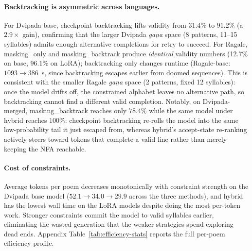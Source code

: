 \documentclass[11pt]{article}
\begin{document}
\paragraph{Backtracking is asymmetric across languages.}
For Dvipada-base, checkpoint backtracking lifts validity from $31.4\%$ to
$91.2\%$ (a $2.9\times$ gain), confirming that the larger Dvipada
\textit{ga\d{n}a} space (8 patterns, 11--15 syllables) admits enough
alternative completions for retry to succeed. For Ragale, masking\_only
and masking\_backtrack produce \emph{identical} validity numbers (12.7\%
on base, 96.1\% on LoRA); backtracking only changes runtime (Ragale-base:
$1093 \to 386$~s, since backtracking escapes earlier from doomed sequences).
This is consistent with the smaller Ragale \textit{ga\d{n}a} space
(2 patterns, fixed 12 syllables): once
the model drifts off, the constrained alphabet leaves no alternative path,
so backtracking cannot find a different valid completion. Notably, on
Dvipada-merged, masking\_backtrack reaches only $78.4\%$ while the same
model under hybrid reaches $100\%$: checkpoint backtracking re-rolls the
model into the same low-probability tail it just escaped from, whereas
hybrid's accept-state re-ranking actively steers toward tokens that
complete a valid line rather than merely keeping the NFA reachable.

\paragraph{Cost of constraints.}
Average tokens per poem decreases monotonically with constraint strength
on the Dvipada base model ($52.1 \to 34.0 \to 29.9$ across the three
methods), and hybrid has the lowest wall time on the LoRA models despite
doing the most per-token work. Stronger constraints commit the model to
valid syllables earlier, eliminating the wasted generation that the weaker
strategies spend exploring dead ends.
Appendix Table~\ref{tab:efficiency-stats} reports the full per-poem
efficiency profile.
\end{document}
